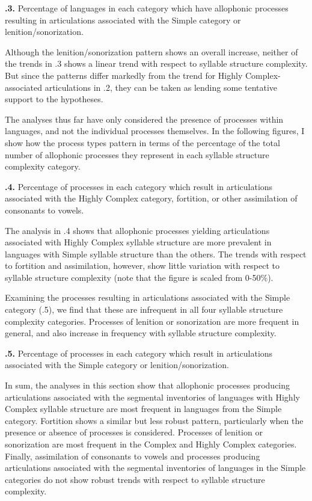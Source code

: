 \textbf{.3.} Percentage of languages in each category which have allophonic processes resulting in articulations associated with the Simple category or lenition/sonorization.

  Although the lenition/sonorization pattern shows an overall increase, neither of the trends in .3 shows a linear trend with respect to syllable structure complexity. But since the patterns differ markedly from the trend for Highly Complex-associated articulations in .2, they can be taken as lending some tentative support to the hypotheses.

  The analyses thus far have only considered the presence of processes within languages, and not the individual processes themselves. In the following figures, I show how the process types pattern in terms of the percentage of the total number of allophonic processes they represent in each syllable structure complexity category.

\textbf{.4.} Percentage of processes in each category which result in articulations associated with the Highly Complex category, fortition, or other assimilation of consonants to vowels.

  The analysis in .4 shows that allophonic processes yielding articulations associated with Highly Complex syllable structure are more prevalent in languages with Simple syllable structure than the others. The trends with respect to fortition and assimilation, however, show little variation with respect to syllable structure complexity (note that the figure is scaled from 0-50\%).

  Examining the processes resulting in articulations associated with the Simple category (.5), we find that these are infrequent in all four syllable structure complexity categories. Processes of lenition or sonorization are more frequent in general, and also increase in frequency with syllable structure complexity.

\textbf{.5.} Percentage of processes in each category which result in articulations associated with the Simple category or lenition/sonorization.

  In sum, the analyses in this section show that allophonic processes producing articulations associated with the segmental inventories of languages with Highly Complex syllable structure are most frequent in languages from the Simple category. Fortition shows a similar but less robust pattern, particularly when the presence or absence of processes is considered. Processes of lenition or sonorization are most frequent in the Complex and Highly Complex categories. Finally, assimilation of consonants to vowels and processes producing articulations associated with the segmental inventories of languages in the Simple categories do not show robust trends with respect to syllable structure complexity.

